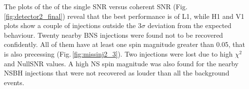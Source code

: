 \documentclass[binding=0.6cm, LaM]{sapthesis}
\begin{document}
        The plots of the of the single SNR versus coherent SNR (Fig.\,\ref{fig:detector2_final}) reveal that 
	the best performance is of L1, while H1 and  V1 plots show a couple of injections outside the $3\sigma$ 
	deviation from the expected behaviour.
	Twenty nearby BNS injections were found not to be recovered confidently.
        All of them have at least one spin magnitude greater than 0.05, that is also precessing (Fig.\,\ref{fig:missinj2_3}).
	Two injections were lost due to high $\chi^2$ and NullSNR values.
	A high NS spin magnitude was also found for the nearby NSBH injections that were not recovered as louder than all the background events.
        \begin{figure}[!t]
          \noindent
          \label{detector2_final}

\end{figure}
\end{document}
